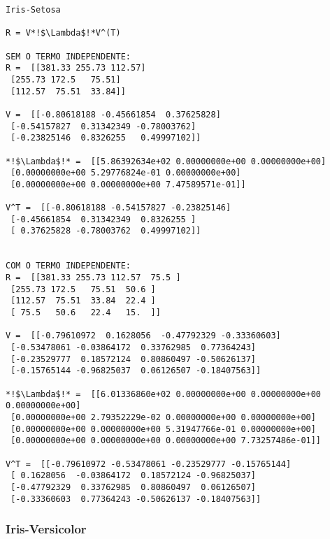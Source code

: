 \documentclass[a4paper,12pt,twoside]{article}
\begin{document}
\begin{lstlisting}
Iris-Setosa

R = V*!$\Lambda$!*V^(T)

SEM O TERMO INDEPENDENTE: 
R =  [[381.33 255.73 112.57]
 [255.73 172.5   75.51]
 [112.57  75.51  33.84]]

V =  [[-0.80618188 -0.45661854  0.37625828]
 [-0.54157827  0.31342349 -0.78003762]
 [-0.23825146  0.8326255   0.49997102]]

*!$\Lambda$!* =  [[5.86392634e+02 0.00000000e+00 0.00000000e+00]
 [0.00000000e+00 5.29776824e-01 0.00000000e+00]
 [0.00000000e+00 0.00000000e+00 7.47589571e-01]]

V^T =  [[-0.80618188 -0.54157827 -0.23825146]
 [-0.45661854  0.31342349  0.8326255 ]
 [ 0.37625828 -0.78003762  0.49997102]]


COM O TERMO INDEPENDENTE: 
R =  [[381.33 255.73 112.57  75.5 ]
 [255.73 172.5   75.51  50.6 ]
 [112.57  75.51  33.84  22.4 ]
 [ 75.5   50.6   22.4   15.  ]]

V =  [[-0.79610972  0.1628056  -0.47792329 -0.33360603]
 [-0.53478061 -0.03864172  0.33762985  0.77364243]
 [-0.23529777  0.18572124  0.80860497 -0.50626137]
 [-0.15765144 -0.96825037  0.06126507 -0.18407563]]

*!$\Lambda$!* =  [[6.01336860e+02 0.00000000e+00 0.00000000e+00 0.00000000e+00]
 [0.00000000e+00 2.79352229e-02 0.00000000e+00 0.00000000e+00]
 [0.00000000e+00 0.00000000e+00 5.31947766e-01 0.00000000e+00]
 [0.00000000e+00 0.00000000e+00 0.00000000e+00 7.73257486e-01]]

V^T =  [[-0.79610972 -0.53478061 -0.23529777 -0.15765144]
 [ 0.1628056  -0.03864172  0.18572124 -0.96825037]
 [-0.47792329  0.33762985  0.80860497  0.06126507]
 [-0.33360603  0.77364243 -0.50626137 -0.18407563]]

\end{lstlisting}

\subsubsection{Iris-Versicolor}
\end{document}
